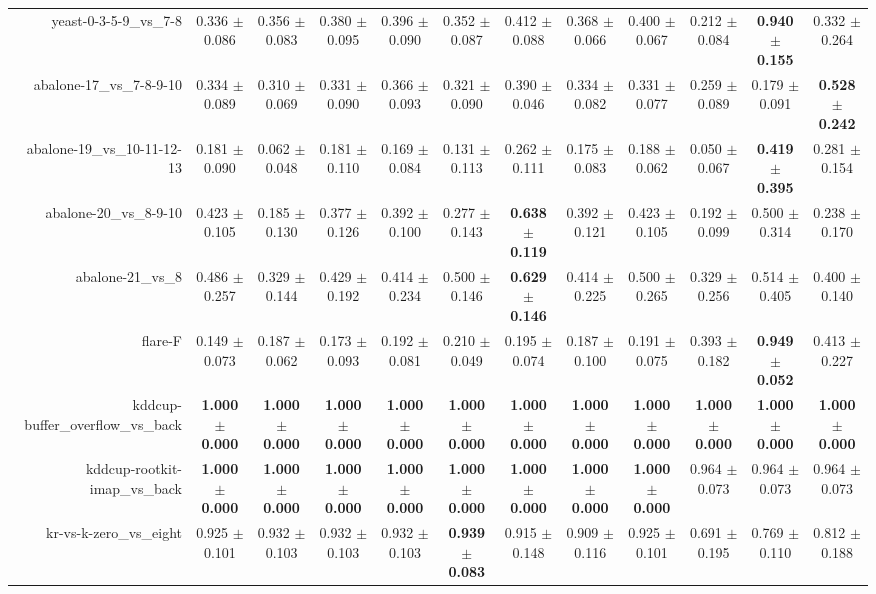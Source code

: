 \begin{table}[!ht]
{\begin{tabular}{r c c c c c c c c c c c}
yeast-0-3-5-9\_vs\_7-8 & 0.336 $\pm$ 0.086 & 0.356 $\pm$ 0.083 & 0.380 $\pm$ 0.095 & 0.396 $\pm$ 0.090 & 0.352 $\pm$ 0.087 & 0.412 $\pm$ 0.088 & 0.368 $\pm$ 0.066 & 0.400 $\pm$ 0.067 & 0.212 $\pm$ 0.084 & \textbf{0.940 $\pm$ 0.155} & 0.332 $\pm$ 0.264 \\
abalone-17\_vs\_7-8-9-10 & 0.334 $\pm$ 0.089 & 0.310 $\pm$ 0.069 & 0.331 $\pm$ 0.090 & 0.366 $\pm$ 0.093 & 0.321 $\pm$ 0.090 & 0.390 $\pm$ 0.046 & 0.334 $\pm$ 0.082 & 0.331 $\pm$ 0.077 & 0.259 $\pm$ 0.089 & 0.179 $\pm$ 0.091 & \textbf{0.528 $\pm$ 0.242} \\
abalone-19\_vs\_10-11-12-13 & 0.181 $\pm$ 0.090 & 0.062 $\pm$ 0.048 & 0.181 $\pm$ 0.110 & 0.169 $\pm$ 0.084 & 0.131 $\pm$ 0.113 & 0.262 $\pm$ 0.111 & 0.175 $\pm$ 0.083 & 0.188 $\pm$ 0.062 & 0.050 $\pm$ 0.067 & \textbf{0.419 $\pm$ 0.395} & 0.281 $\pm$ 0.154 \\
abalone-20\_vs\_8-9-10 & 0.423 $\pm$ 0.105 & 0.185 $\pm$ 0.130 & 0.377 $\pm$ 0.126 & 0.392 $\pm$ 0.100 & 0.277 $\pm$ 0.143 & \textbf{0.638 $\pm$ 0.119} & 0.392 $\pm$ 0.121 & 0.423 $\pm$ 0.105 & 0.192 $\pm$ 0.099 & 0.500 $\pm$ 0.314 & 0.238 $\pm$ 0.170 \\
abalone-21\_vs\_8 & 0.486 $\pm$ 0.257 & 0.329 $\pm$ 0.144 & 0.429 $\pm$ 0.192 & 0.414 $\pm$ 0.234 & 0.500 $\pm$ 0.146 & \textbf{0.629 $\pm$ 0.146} & 0.414 $\pm$ 0.225 & 0.500 $\pm$ 0.265 & 0.329 $\pm$ 0.256 & 0.514 $\pm$ 0.405 & 0.400 $\pm$ 0.140 \\
flare-F & 0.149 $\pm$ 0.073 & 0.187 $\pm$ 0.062 & 0.173 $\pm$ 0.093 & 0.192 $\pm$ 0.081 & 0.210 $\pm$ 0.049 & 0.195 $\pm$ 0.074 & 0.187 $\pm$ 0.100 & 0.191 $\pm$ 0.075 & 0.393 $\pm$ 0.182 & \textbf{0.949 $\pm$ 0.052} & 0.413 $\pm$ 0.227 \\
kddcup-buffer\_overflow\_vs\_back & \textbf{1.000 $\pm$ 0.000} & \textbf{1.000 $\pm$ 0.000} & \textbf{1.000 $\pm$ 0.000} & \textbf{1.000 $\pm$ 0.000} & \textbf{1.000 $\pm$ 0.000} & \textbf{1.000 $\pm$ 0.000} & \textbf{1.000 $\pm$ 0.000} & \textbf{1.000 $\pm$ 0.000} & \textbf{1.000 $\pm$ 0.000} & \textbf{1.000 $\pm$ 0.000} & \textbf{1.000 $\pm$ 0.000} \\
kddcup-rootkit-imap\_vs\_back & \textbf{1.000 $\pm$ 0.000} & \textbf{1.000 $\pm$ 0.000} & \textbf{1.000 $\pm$ 0.000} & \textbf{1.000 $\pm$ 0.000} & \textbf{1.000 $\pm$ 0.000} & \textbf{1.000 $\pm$ 0.000} & \textbf{1.000 $\pm$ 0.000} & \textbf{1.000 $\pm$ 0.000} & 0.964 $\pm$ 0.073 & 0.964 $\pm$ 0.073 & 0.964 $\pm$ 0.073 \\
kr-vs-k-zero\_vs\_eight & 0.925 $\pm$ 0.101 & 0.932 $\pm$ 0.103 & 0.932 $\pm$ 0.103 & 0.932 $\pm$ 0.103 & \textbf{0.939 $\pm$ 0.083} & 0.915 $\pm$ 0.148 & 0.909 $\pm$ 0.116 & 0.925 $\pm$ 0.101 & 0.691 $\pm$ 0.195 & 0.769 $\pm$ 0.110 & 0.812 $\pm$ 0.188 \\

\end{tabular}}
\end{table}
